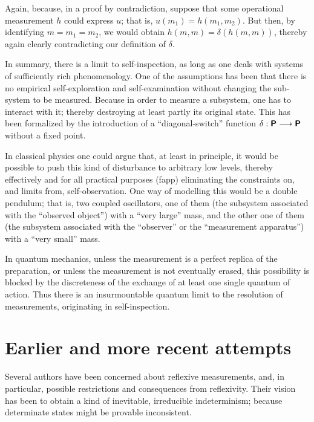 Again, because, in a proof by contradiction, suppose that some operational measurement $h$ could express $u$;
that is,  $u(m_1) = h(m_1,m_2)$.
But then, by identifying $m=m_1=m_2$, we would obtain
$h(m,m)=\delta(h(m,m))$,
thereby again clearly contradicting our definition of $\delta$.

In summary, there is a limit to self-inspection, as long as one deals with
systems of sufficiently rich phenomenology.
One of the assumptions has been that there is no empirical self-exploration and self-examination without
changing the sub-system to be measured. Because in order to measure a subsystem, one has to interact with it;
thereby destroying at least partly its original state.
This has been formalized by the introduction of a ``diagonal-switch'' function
$\delta: \textsf{\textbf{P}} \longrightarrow \textsf{\textbf{P}}$
without a fixed point.

In classical physics one could argue that, at least in principle, it would be possible
to push this kind of disturbance to arbitrary low levels,
thereby effectively and for all practical purposes (fapp)
eliminating the constraints on, and limits from, self-observation.
One way of modelling this would be a double pendulum; that is,  two coupled oscillators,
one of them (the subsystem associated with the ``observed object'') with a ``very large'' mass,
and the other one of them (the subsystem associated with the ``observer'' or the ``measurement apparatus'')
with a ``very small'' mass.

In quantum mechanics,
unless the measurement is a perfect replica of the preparation, or unless the measurement is not eventually erased,
this possibility is blocked by the discreteness of the exchange of at least one single quantum of action.
Thus there is an insurmountable quantum limit to the resolution of measurements,
originating in self-inspection.


\section{Earlier and more recent attempts}
\label{2016-pu-book-chapter-rm-ea}

Several authors have been concerned about reflexive measurements, and,
in particular,
possible restrictions and consequences from reflexivity.
Their vision has been to obtain a kind of inevitable, irreducible indeterminism;
because determinate states might be provable inconsistent.

